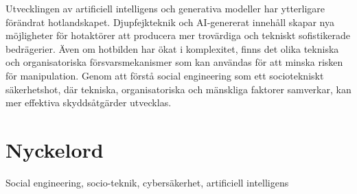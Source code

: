 \documentclass[a4paper,12pt, oneside]{book}
\begin{document}
Utvecklingen av artificiell intelligens och generativa modeller har ytterligare förändrat hotlandskapet. Djupfejkteknik och AI-genererat innehåll skapar nya möjligheter för hotaktörer att producera 
mer trovärdiga och tekniskt sofistikerade bedrägerier. Även om hotbilden har ökat i komplexitet, finns det olika tekniska och organisatoriska försvarsmekanismer som kan användas för att minska risken för manipulation. 
Genom att förstå social engineering som ett sociotekniskt säkerhetshot, där tekniska, organisatoriska och mänskliga faktorer samverkar, kan mer effektiva skyddsåtgärder utvecklas.

\section*{\LARGE Nyckelord}
Social engineering, socio-teknik, cybersäkerhet, artificiell intelligens
\tableofcontents 

\endgroup %

\clearpage
\pagestyle{plain}    

\onehalfspacing


 

 

 



 

 


\end{document}
